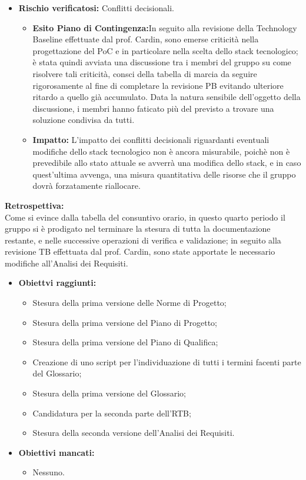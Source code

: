 \begin{itemize}
    \item \textbf{Rischio verificatosi:} Conflitti decisionali.
    \begin{itemize}
        \item \textbf{Esito Piano di Contingenza:}In seguito alla revisione della Technology Baseline effettuate dal prof. Cardin, sono emerse criticità nella progettazione
        del PoC e in particolare nella scelta dello stack tecnologico; è stata quindi avviata una discussione tra i membri del gruppo su come risolvere tali criticità,
        consci della tabella di marcia da seguire rigorosamente al fine di completare la revisione PB evitando ulteriore ritardo a quello già accumulato. Data la 
        natura sensibile dell'oggetto della discussione, i membri hanno faticato più del previsto a trovare una soluzione condivisa da tutti.
        \item \textbf{Impatto:} L'impatto dei conflitti decisionali riguardanti eventuali modifiche dello stack tecnologico non è ancora misurabile, poichè non è
        prevedibile allo stato attuale  se avverrà una modifica dello stack, e in caso quest'ultima avvenga, una misura quantitativa delle risorse che il gruppo dovrà
        forzatamente riallocare.
    \end{itemize}
\end{itemize}

\textbf{Retrospettiva:} \\
Come si evince dalla tabella del consuntivo orario, in questo quarto periodo il gruppo si è prodigato nel terminare la stesura di tutta la documentazione restante,
e nelle successive operazioni di verifica e validazione; in seguito alla revisione TB effettuata dal prof. Cardin, sono state apportate le necessario modifiche all'Analisi
dei Requisiti.
\begin{itemize} 
    \item \textbf{Obiettvi raggiunti:}
    \begin{itemize}
        \item Stesura della prima versione delle Norme di Progetto;
        \item Stesura della prima versione del Piano di Progetto;
        \item Stesura della prima versione del Piano di Qualifica;
        \item Creazione di uno script per l'individuazione di tutti i termini facenti parte del Glossario;
        \item Stesura della prima versione del Glossario;
        \item Candidatura per la seconda parte dell'RTB;
        \item Stesura della seconda versione dell'Analisi dei Requisiti.
    \end{itemize}
    \item \textbf{Obiettivi mancati:}
    \begin{itemize}
        \item Nessuno.
    \end{itemize}
\end{itemize}

